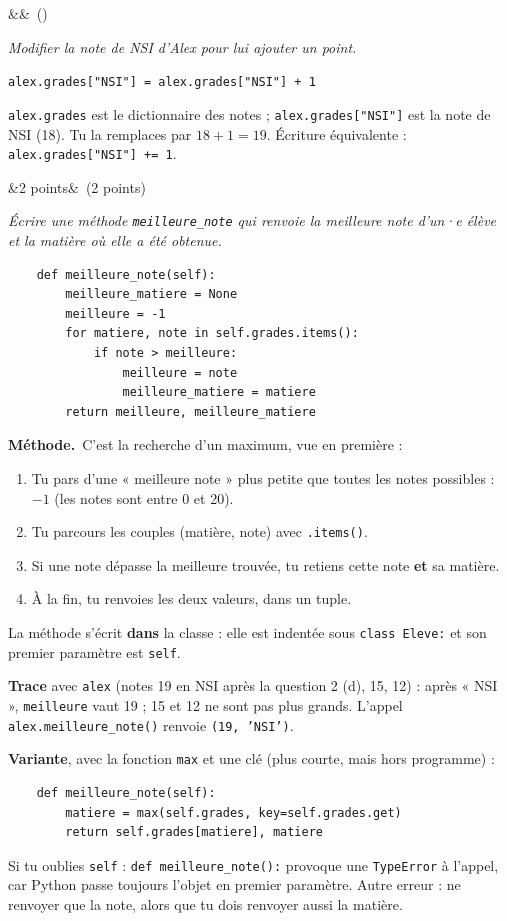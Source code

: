 \documentclass[11pt, a4paper]{exam}
\newcommand{\code}[1]{\texttt{#1}}
\newcommand{\Q}[3]{\par\needspace{5\baselineskip}\bigskip\noindent{\large\bfseries Question #1}\ifx&#2&\else\ \textnormal{(#2)}\fi\par\nopagebreak\smallskip\noindent\textit{#3}\par\nopagebreak\smallskip}
\newcommand{\methode}{\par\noindent\textbf{Méthode.}\ }
\begin{document}
\Q{2 (d)}{}{Modifier la note de NSI d'Alex pour lui ajouter un point.}
\begin{reponse}
\code{alex.grades["NSI"] = alex.grades["NSI"] + 1}
\end{reponse}
\code{alex.grades} est le dictionnaire des notes ; \code{alex.grades["NSI"]} est la note de NSI (18). Tu la remplaces par $18 + 1 = 19$. Écriture équivalente : \code{alex.grades["NSI"] += 1}.

\Q{3}{2 points}{Écrire une méthode \code{meilleure\_note} qui renvoie la meilleure note d'un·e élève et la matière où elle a été obtenue.}
\begin{reponse}
\begin{lstlisting}
    def meilleure_note(self):
        meilleure_matiere = None
        meilleure = -1
        for matiere, note in self.grades.items():
            if note > meilleure:
                meilleure = note
                meilleure_matiere = matiere
        return meilleure, meilleure_matiere
\end{lstlisting}
\end{reponse}
\methode C'est la recherche d'un maximum, vue en première :
\begin{enumerate}
\item Tu pars d'une « meilleure note » plus petite que toutes les notes possibles : $-1$ (les notes sont entre 0 et 20).
\item Tu parcours les couples (matière, note) avec \code{.items()}.
\item Si une note dépasse la meilleure trouvée, tu retiens cette note \textbf{et} sa matière.
\item À la fin, tu renvoies les deux valeurs, dans un tuple.
\end{enumerate}
La méthode s'écrit \textbf{dans} la classe : elle est indentée sous \code{class Eleve:} et son premier paramètre est \code{self}.

\textbf{Trace} avec \code{alex} (notes 19 en NSI après la question 2 (d), 15, 12) : après « NSI », \code{meilleure} vaut 19 ; 15 et 12 ne sont pas plus grands. L'appel \code{alex.meilleure\_note()} renvoie \code{(19, 'NSI')}.

\textbf{Variante}, avec la fonction \code{max} et une clé (plus courte, mais hors programme) :
\begin{lstlisting}
    def meilleure_note(self):
        matiere = max(self.grades, key=self.grades.get)
        return self.grades[matiere], matiere
\end{lstlisting}
\begin{erreur}
Si tu oublies \code{self} : \code{def meilleure\_note():} provoque une \code{TypeError} à l'appel, car Python passe toujours l'objet en premier paramètre. Autre erreur : ne renvoyer que la note, alors que tu dois renvoyer aussi la matière.
\end{erreur}
\end{document}
